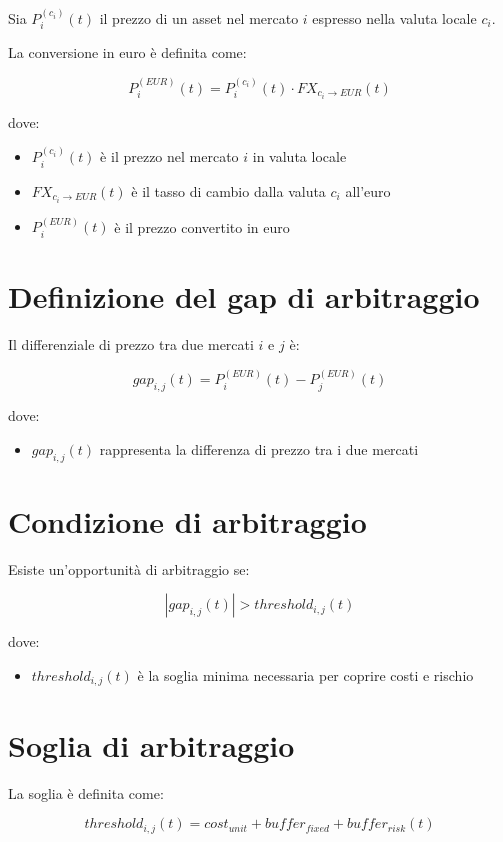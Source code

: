 \documentclass[10pt,final]{article}
\begin{document}
Sia $P_i^{(c_i)}(t)$ il prezzo di un asset nel mercato $i$ espresso nella valuta locale $c_i$.

La conversione in euro è definita come:

\[
P_i^{(EUR)}(t) = P_i^{(c_i)}(t) \cdot FX_{c_i \to EUR}(t)
\]

dove:
\begin{itemize}
    \item $P_i^{(c_i)}(t)$ è il prezzo nel mercato $i$ in valuta locale
    \item $FX_{c_i \to EUR}(t)$ è il tasso di cambio dalla valuta $c_i$ all'euro
    \item $P_i^{(EUR)}(t)$ è il prezzo convertito in euro
\end{itemize}


\section{Definizione del gap di arbitraggio}

Il differenziale di prezzo tra due mercati $i$ e $j$ è:

\[
gap_{i,j}(t) = P_i^{(EUR)}(t) - P_j^{(EUR)}(t)
\]

dove:
\begin{itemize}
    \item $gap_{i,j}(t)$ rappresenta la differenza di prezzo tra i due mercati
\end{itemize}


\section{Condizione di arbitraggio}

Esiste un'opportunità di arbitraggio se:

\[
|gap_{i,j}(t)| > threshold_{i,j}(t)
\]

dove:
\begin{itemize}
    \item $threshold_{i,j}(t)$ è la soglia minima necessaria per coprire costi e rischio
\end{itemize}


\section{Soglia di arbitraggio}

La soglia è definita come:

\[
threshold_{i,j}(t) = cost_{unit} + buffer_{fixed} + buffer_{risk}(t)
\]
\end{document}
